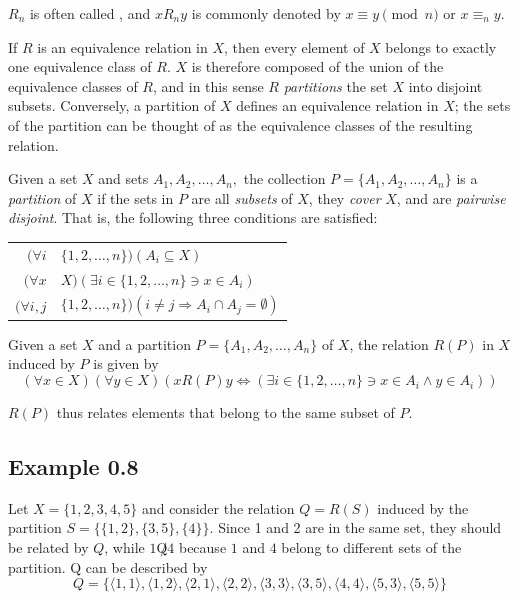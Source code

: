 $R_n$ is often called \emph{}, and $x R_n y$ is
commonly denoted by $x \equiv y \pmod{ n}$ or $x \equiv _n$$y$.

If $R$ is an equivalence relation in $X$, then every element of $X$ belongs to
exactly one equivalence class of $R$. $X$ is therefore composed of the union of
the equivalence classes of $R$, and in this sense $R$ \emph{partitions} the set
$X$ into disjoint subsets. Conversely, a partition of $X$ defines an equivalence
relation in $X$; the sets of the partition can be thought of as the equivalence
classes of the resulting relation.

\begin{dfn}\label{dfn-0.8}
Given a set $X$ and sets
$A_1 , A_2 , \ldots , A_n ,$ the collection $P = \{A_1 ,A_2 , \ldots ,A_n \}$
is a \emph{partition} of $X$ if the sets in $P$ are all \emph{subsets} of $X$,
they \emph{cover} $X$, and are \emph{pairwise disjoint}. That is, the following
three conditions are satisfied:

\begin{tabular}{r@{ $\in$ }l}
$(\forall i$ & $\{1,2, \ldots ,n\})(A_i \subseteq X)$ \\
$(\forall x$ & $X)(\exists i \in \{1,2, \ldots ,n\} \ni x \in A_i )$ \\
$(\forall i,j$ & $\{1, 2, \ldots ,n\})(i \not= j \Rightarrow A_i \cap A_j = \emptyset)$
\end{tabular}
\end{dfn}

\begin{dfn}\label{dfn-0.9}
Given a set $X$ and a partition $P = \{A_1,A_2, \ldots ,A_n \}$ of $X$,
the relation $R(P)$ in $X$ induced by $P$ is given by
\[(\forall x \in X)(\forall y \in X)(x   R(P)   y \Leftrightarrow
  (\exists i \in \{1,2, \ldots ,n\} \ni x \in A_i \wedge y\in A_i))\]
\end{dfn}

$R(P)$ thus relates elements that belong to the same subset of $P$.

\subsection*{Example 0.8}

Let $X = \{1, 2, 3, 4, 5\}$ and consider the relation $Q = R(S)$ induced by the
partition $S = \{\{1, 2\},\{3, 5\},\{4\}\}$.
Since 1 and 2 are in the same set, they should be related by $Q$, while
$1$$\not   Q 4$ because $1$ and $4$ belong to different sets of the partition.
Q can be described by
\[ Q = \{\langle 1, 1\rangle, \langle 1,2\rangle, \langle 2, 1\rangle,
\langle 2,2\rangle, \langle 3,3\rangle, \langle 3, 5\rangle,
\langle 4, 4\rangle, \langle 5, 3\rangle, \langle 5, 5\rangle\} \]

